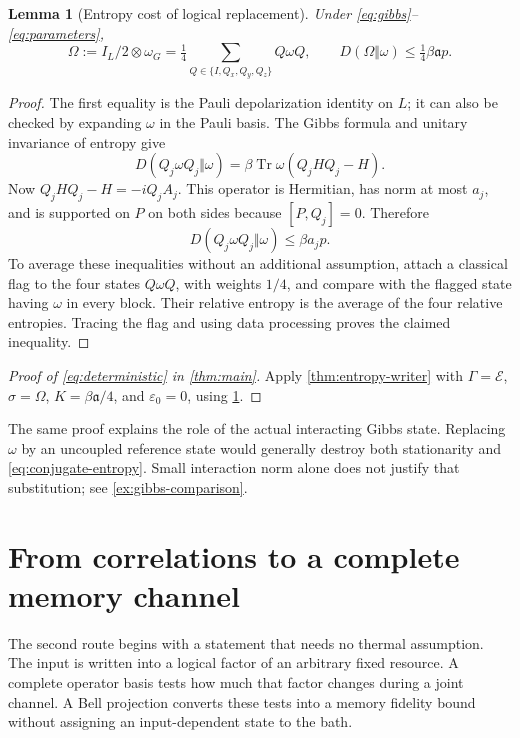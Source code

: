 \documentclass[11pt,reqno]{amsart}
\numberwithin{equation}{section}
\newtheorem{lemma}[theorem]{Lemma}
\theoremstyle{definition}
\theoremstyle{remark}
\newcommand{\Tr}{\operatorname{Tr}}
\newcommand{\Ecal}{\mathcal E}
\newcommand{\pa}{\mathfrak a}
\begin{document}
\begin{lemma}[Entropy cost of logical replacement]\label{lem:reset-entropy}
Under \eqref{eq:gibbs}--\eqref{eq:parameters},
\[
 \Omega:=I_L/2\otimes\omega_G
       =\tfrac14\sum_{Q\in\{I,Q_x,Q_y,Q_z\}}Q\omega Q,
 \qquad
 D(\Omega\Vert\omega)\le\tfrac14\beta\pa p.
\]
\end{lemma}
\begin{proof}
The first equality is the Pauli depolarization identity on \(L\);
it can also be checked by expanding \(\omega\) in the Pauli basis.
The Gibbs formula and unitary invariance of entropy give
\[
 D(Q_j\omega Q_j\Vert\omega)
       =\beta\Tr\omega(Q_jHQ_j-H).
\]
Now \(Q_jHQ_j-H=-iQ_jA_j\). This operator is Hermitian, has norm at
most \(a_j\), and is supported on \(P\) on both sides because
\([P,Q_j]=0\). Therefore
\begin{equation}\label{eq:conjugate-entropy}
       D(Q_j\omega Q_j\Vert\omega)\le\beta a_j p.
\end{equation}
To average these inequalities without an additional assumption, attach
a classical flag to the four states \(Q\omega Q\), with weights \(1/4\),
and compare with the flagged state having \(\omega\) in every block.
Their relative entropy is the average of the four relative entropies.
Tracing the flag and using data processing proves the claimed inequality.
\end{proof}

\begin{proof}[Proof of \eqref{eq:deterministic} in \cref{thm:main}]
Apply \cref{thm:entropy-writer} with
\(\Gamma=\Ecal\), \(\sigma=\Omega\), \(K=\beta\pa/4\),
and \(\varepsilon_0=0\), using \cref{lem:reset-entropy}.
\end{proof}

The same proof explains the role of the actual interacting Gibbs state.
Replacing \(\omega\) by an uncoupled reference state would generally destroy
both stationarity and \eqref{eq:conjugate-entropy}. Small interaction norm
alone does not justify that substitution; see \cref{ex:gibbs-comparison}.

\section{From correlations to a complete memory channel}\label{sec:channel}

The second route begins with a statement that needs no thermal assumption.
The input is written into a logical factor of an arbitrary fixed resource.
A complete operator basis tests how much that factor changes during a
joint channel. A Bell projection converts these tests into a memory
fidelity bound without assigning an input-dependent state to the bath.
\end{document}
